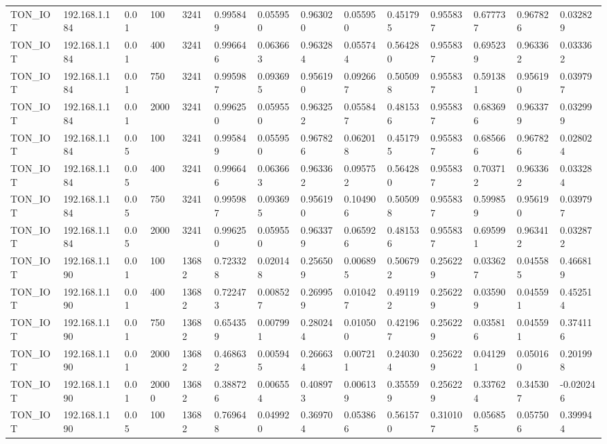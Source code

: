 \begin{tabular}{llllllllllllll}
TON\_IOT & 192.168.1.184 & 0.01 & 100 & 3241 & 0.995849 & 0.055950 & 0.963020 & 0.055950 & 0.451795 & 0.955837 & 0.677737 & 0.967826 & 0.032829 \\
TON\_IOT & 192.168.1.184 & 0.01 & 400 & 3241 & 0.996646 & 0.063663 & 0.963284 & 0.055744 & 0.564280 & 0.955837 & 0.695239 & 0.963362 & 0.033362 \\
TON\_IOT & 192.168.1.184 & 0.01 & 750 & 3241 & 0.995987 & 0.093695 & 0.956190 & 0.092667 & 0.505098 & 0.955837 & 0.591381 & 0.956190 & 0.039797 \\
TON\_IOT & 192.168.1.184 & 0.01 & 2000 & 3241 & 0.996250 & 0.059550 & 0.963252 & 0.055847 & 0.481536 & 0.955837 & 0.683696 & 0.963379 & 0.032999 \\
TON\_IOT & 192.168.1.184 & 0.05 & 100 & 3241 & 0.995849 & 0.055950 & 0.967826 & 0.062018 & 0.451795 & 0.955837 & 0.685666 & 0.967826 & 0.028024 \\
TON\_IOT & 192.168.1.184 & 0.05 & 400 & 3241 & 0.996646 & 0.063663 & 0.963362 & 0.095752 & 0.564280 & 0.955837 & 0.703712 & 0.963362 & 0.033284 \\
TON\_IOT & 192.168.1.184 & 0.05 & 750 & 3241 & 0.995987 & 0.093695 & 0.956190 & 0.104906 & 0.505098 & 0.955837 & 0.599859 & 0.956190 & 0.039797 \\
TON\_IOT & 192.168.1.184 & 0.05 & 2000 & 3241 & 0.996250 & 0.059550 & 0.963379 & 0.065926 & 0.481536 & 0.955837 & 0.695991 & 0.963412 & 0.032872 \\
TON\_IOT & 192.168.1.190 & 0.01 & 100 & 13682 & 0.723328 & 0.020148 & 0.256509 & 0.006895 & 0.506792 & 0.256229 & 0.033627 & 0.045585 & 0.466819 \\
TON\_IOT & 192.168.1.190 & 0.01 & 400 & 13682 & 0.722473 & 0.008527 & 0.269959 & 0.010427 & 0.491192 & 0.256229 & 0.035909 & 0.045591 & 0.452514 \\
TON\_IOT & 192.168.1.190 & 0.01 & 750 & 13682 & 0.654359 & 0.007991 & 0.280244 & 0.010500 & 0.421967 & 0.256229 & 0.035816 & 0.045591 & 0.374116 \\
TON\_IOT & 192.168.1.190 & 0.01 & 2000 & 13682 & 0.468632 & 0.005945 & 0.266634 & 0.007211 & 0.240304 & 0.256229 & 0.041291 & 0.050160 & 0.201998 \\
TON\_IOT & 192.168.1.190 & 0.01 & 20000 & 13682 & 0.388726 & 0.006554 & 0.408973 & 0.006139 & 0.355599 & 0.256229 & 0.337624 & 0.345307 & -0.020246 \\
TON\_IOT & 192.168.1.190 & 0.05 & 100 & 13682 & 0.769648 & 0.049920 & 0.369704 & 0.053866 & 0.561570 & 0.310107 & 0.056855 & 0.057506 & 0.399944 \\

\end{tabular}
